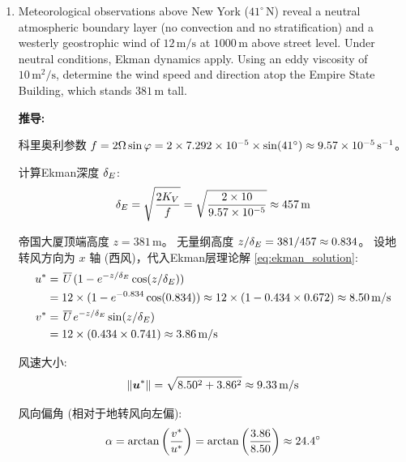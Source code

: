 \begin{enumerate}

    \item Meteorological observations above New York ($41^\circ\,\mathrm{N}$) reveal a neutral atmospheric boundary layer (no convection and no stratification) and a westerly geostrophic wind of $12\,\mathrm{m/s}$ at $1000\,\mathrm{m}$ above street level.
    Under neutral conditions, Ekman dynamics apply.
    Using an eddy viscosity of $10\,\mathrm{m^2/s}$, determine the wind speed and direction atop the Empire State Building, which stands $381\,\mathrm{m}$ tall.

    \vspace{1em}
    \textbf{推导:}

    科里奥利参数 $f = 2 \Omega \sin \varphi = 2 \times 7.292 \times 10^{-5} \times \sin(41^\circ) \approx 9.57 \times 10^{-5}\,\mathrm{s^{-1}}$。

    计算Ekman深度 $\delta_E$:
    \begin{equation*}
        \delta_E = \sqrt{\frac{2K_V}{f}} = \sqrt{\frac{2 \times 10}{9.57 \times 10^{-5}}} \approx 457\,\mathrm{m}
    \end{equation*}

    帝国大厦顶端高度 $z = 381\,\mathrm{m}$。
    无量纲高度 $z/\delta_E = 381/457 \approx 0.834$。
    设地转风方向为 $x$ 轴 (西风)，代入Ekman层理论解 \eqref{eq:ekman_solution}:
    \begin{align*}
        u^* &= \mkern2mu \overline{U} \mkern2mu (1 - e^{-z/\delta_E} \cos(z/\delta_E)) \\
        &= 12 \times (1 - e^{-0.834} \cos(0.834)) \approx 12 \times (1 - 0.434 \times 0.672) \approx 8.50\,\mathrm{m/s} \\
        v^* &= \mkern2mu \overline{U} \mkern2mu e^{-z/\delta_E} \sin(z/\delta_E) \\
        &= 12 \times (0.434 \times 0.741) \approx 3.86\,\mathrm{m/s}
    \end{align*}

    风速大小:
    \begin{equation*}
        \lVert \bm{u}^* \rVert = \sqrt{8.50^2 + 3.86^2} \approx 9.33\,\mathrm{m/s}
    \end{equation*}

    风向偏角 (相对于地转风向左偏):
    \begin{equation*}
        \alpha = \arctan\left(\frac{v^*}{u^*}\right) = \arctan\left(\frac{3.86}{8.50}\right) \approx 24.4^\circ
    \end{equation*}


\end{enumerate}
